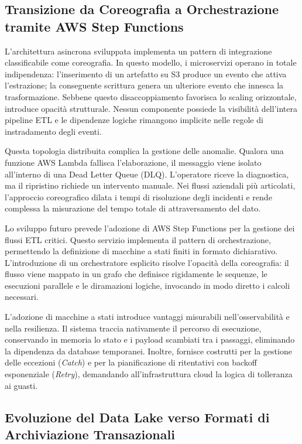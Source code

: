 \subsection{Transizione da Coreografia a Orchestrazione tramite AWS Step Functions}

L'architettura asincrona sviluppata implementa un pattern di integrazione classificabile come coreografia. In questo modello, i microservizi operano in totale indipendenza: l'inserimento di un artefatto su S3 produce un evento che attiva l'estrazione; la conseguente scrittura genera un ulteriore evento che innesca la trasformazione. Sebbene questo disaccoppiamento favorisca lo scaling orizzontale, introduce opacità strutturale. Nessun componente possiede la visibilità dell'intera pipeline ETL e le dipendenze logiche rimangono implicite nelle regole di instradamento degli eventi.

Questa topologia distribuita complica la gestione delle anomalie. Qualora una funzione AWS Lambda fallisca l'elaborazione, il messaggio viene isolato all'interno di una Dead Letter Queue (DLQ). L'operatore riceve la diagnostica, ma il ripristino richiede un intervento manuale. Nei flussi aziendali più articolati, l'approccio coreografico dilata i tempi di risoluzione degli incidenti e rende complessa la misurazione del tempo totale di attraversamento del dato.

Lo sviluppo futuro prevede l'adozione di AWS Step Functions \cite{StepFunctions} per la gestione dei flussi ETL critici. Questo servizio implementa il pattern di orchestrazione, permettendo la definizione di macchine a stati finiti in formato dichiarativo. L'introduzione di un orchestratore esplicito risolve l'opacità della coreografia: il flusso viene mappato in un grafo che definisce rigidamente le sequenze, le esecuzioni parallele e le diramazioni logiche, invocando in modo diretto i calcoli necessari.

L'adozione di macchine a stati introduce vantaggi misurabili nell'osservabilità e nella resilienza. Il sistema traccia nativamente il percorso di esecuzione, conservando in memoria lo stato e i payload scambiati tra i passaggi, eliminando la dipendenza da database temporanei. Inoltre, fornisce costrutti per la gestione delle eccezioni (\emph{Catch}) e per la pianificazione di ritentativi con backoff esponenziale (\emph{Retry}), demandando all'infrastruttura cloud la logica di tolleranza ai guasti.

\subsection{Evoluzione del Data Lake verso Formati di Archiviazione Transazionali}

